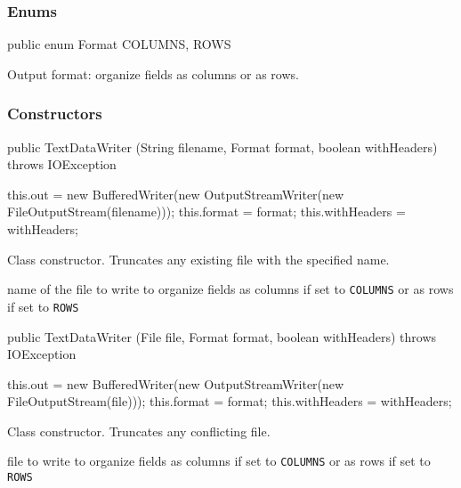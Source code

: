 \subsubsection*{Enums}
\begin{code}

   public enum Format { COLUMNS, ROWS }
\end{code}
\begin{tabb}
Output format: organize fields as columns or as rows.
\end{tabb}
   

\subsubsection*{Constructors}

\begin{code}

   public TextDataWriter (String filename, Format format, boolean withHeaders)
         throws IOException \begin{hide} {
      this.out = new BufferedWriter(new OutputStreamWriter(new FileOutputStream(filename)));
      this.format = format;
      this.withHeaders = withHeaders;
   }
   \end{hide}
\end{code}
\begin{tabb}
Class constructor. Truncates any existing file with the specified name.
\end{tabb}
\begin{htmlonly}
   {name of the file to write to}
     {organize fields as columns if set to \texttt{COLUMNS} or as rows if set to \texttt{ROWS}}
\end{htmlonly}
\begin{code}
   
   public TextDataWriter (File file, Format format, boolean withHeaders)
         throws IOException \begin{hide} {
      this.out = new BufferedWriter(new OutputStreamWriter(new FileOutputStream(file)));
      this.format = format;
      this.withHeaders = withHeaders;
   }
   \end{hide}
\end{code}
\begin{tabb}
Class constructor. Truncates any conflicting file.
\end{tabb}
\begin{htmlonly}
       {file to write to}
     {organize fields as columns if set to \texttt{COLUMNS} or as rows if set to \texttt{ROWS}}
\end{htmlonly}
